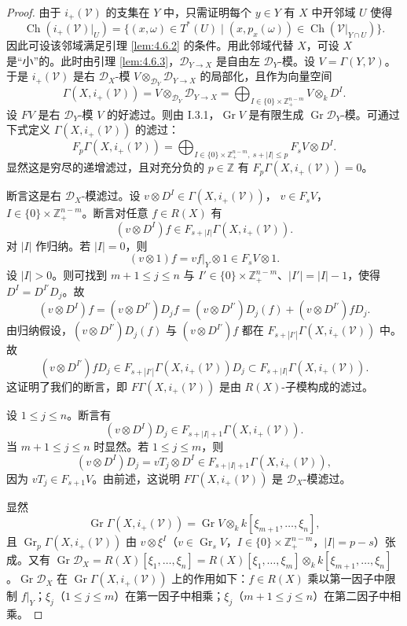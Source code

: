 \begin{proof}
由于 $i_+(\mathcal{V})$ 的支集在 $Y$ 中，只需证明每个 $y\in Y$ 有 $X$ 中开邻域 $U$ 使得
$$\operatorname{Ch}(i_+(\mathcal{V})|_U)=\{(x,\omega)\in T^*(U)\mid(x,p_x(\omega))\in\operatorname{Ch}(\mathcal{V}|_{Y\cap U})\}.$$
因此可设该邻域满足引理 \ref{lem:4.6.2} 的条件。用此邻域代替 $X$，可设 $X$ 是“小”的。此时由引理 \ref{lem:4.6.3}，$\mathcal{D}_{Y\to X}$ 是自由左 $\mathcal{D}_Y$-模。设 $V=\Gamma(Y,\mathcal{V})$。于是 $i_+(\mathcal{V})$ 是右 $\mathcal{D}_X$-模 $V\otimes_{\mathcal{D}_Y}\mathcal{D}_{Y\to X}$ 的局部化，且作为向量空间
$$\Gamma(X,i_+(\mathcal{V}))=V\otimes_{\mathcal{D}_Y}\mathcal{D}_{Y\to X}
=\bigoplus_{I\in\{0\}\times\mathbb{Z}_+^{n-m}}V\otimes_kD^I.$$
设 $FV$ 是右 $\mathcal{D}_Y$-模 $V$ 的好滤过。则由 I.3.1，$\operatorname{Gr}V$ 是有限生成 $\operatorname{Gr}\mathcal{D}_Y$-模。可通过下式定义 $\Gamma(X,i_+(\mathcal{V}))$ 的滤过：
$$F_p\Gamma(X,i_+(\mathcal{V}))=\bigoplus_{I\in\{0\}\times\mathbb{Z}_+^{n-m},\ s+|I|\le p}F_sV\otimes D^I.$$
显然这是穷尽的递增滤过，且对充分负的 $p\in\mathbb{Z}$ 有 $F_p\Gamma(X,i_+(\mathcal{V}))=0$。

断言这是右 $\mathcal{D}_X$-模滤过。设 $v\otimes D^I\in\Gamma(X,i_+(\mathcal{V}))$，
$v\in F_sV$，$I\in\{0\}\times\mathbb{Z}_+^{n-m}$。断言对任意 $f\in R(X)$ 有
$$(v\otimes D^I)f\in F_{s+|I|}\Gamma(X,i_+(\mathcal{V})).$$
对 $|I|$ 作归纳。若 $|I|=0$，则
$$(v\otimes1)f=vf|_Y\otimes1\in F_sV\otimes1.$$
设 $|I|>0$。则可找到 $m+1\le j\le n$ 与 $I'\in\{0\}\times\mathbb{Z}_+^{n-m}$、$|I'|=|I|-1$，使得 $D^I=D^{I'}D_j$。故
$$(v\otimes D^I)f=(v\otimes D^{I'})D_jf=(v\otimes D^{I'})D_j(f)+(v\otimes D^{I'})fD_j.$$
由归纳假设，$(v\otimes D^{I'})D_j(f)$ 与 $(v\otimes D^{I'})f$ 都在 $F_{s+|I'|}\Gamma(X,i_+(\mathcal{V}))$ 中。故
$$(v\otimes D^{I'})fD_j\in F_{s+|I'|}\Gamma(X,i_+(\mathcal{V}))D_j
\subset F_{s+|I|}\Gamma(X,i_+(\mathcal{V})).$$
这证明了我们的断言，即 $F\Gamma(X,i_+(\mathcal{V}))$ 是由 $R(X)$-子模构成的滤过。

设 $1\le j\le n$。断言有
$$(v\otimes D^I)D_j\in F_{s+|I|+1}\Gamma(X,i_+(\mathcal{V})).$$
当 $m+1\le j\le n$ 时显然。若 $1\le j\le m$，则
$$(v\otimes D^I)D_j=vT_j\otimes D^I\in F_{s+|I|+1}\Gamma(X,i_+(\mathcal{V})),$$
因为 $vT_j\in F_{s+1}V$。由前述，这说明 $F\Gamma(X,i_+(\mathcal{V}))$ 是 $\mathcal{D}_X$-模滤过。

显然
$$\operatorname{Gr}\Gamma(X,i_+(\mathcal{V}))=\operatorname{Gr}V\otimes_kk[\xi_{m+1},\dots,\xi_n],$$
且 $\operatorname{Gr}_p\Gamma(X,i_+(\mathcal{V}))$ 由 $v\otimes\xi^I$（$v\in\operatorname{Gr}_sV$，$I\in\{0\}\times\mathbb{Z}_+^{n-m}$，$|I|=p-s$）张成。又有
$\operatorname{Gr}\mathcal{D}_X=R(X)[\xi_1,\dots,\xi_n]=R(X)[\xi_1,\dots,\xi_m]\otimes_kk[\xi_{m+1},\dots,\xi_n]$。$\operatorname{Gr}\mathcal{D}_X$ 在 $\operatorname{Gr}\Gamma(X,i_+(\mathcal{V}))$ 上的作用如下：$f\in R(X)$ 乘以第一因子中限制 $f|_Y$；$\xi_j$（$1\le j\le m$）在第一因子中相乘；$\xi_j$（$m+1\le j\le n$）在第二因子中相乘。


\end{proof}
